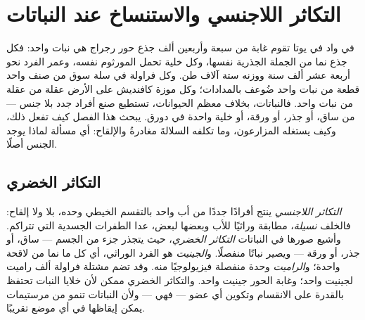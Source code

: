 \chapter{التكاثر اللاجنسي والاستنساخ عند النباتات}\label{ch:b2:asexual-reproduction}

في واد في يوتا تقوم غابة من سبعة وأربعين ألف جذع حور رجراج هي نبات
واحد: فكل جذع نما من الجملة الجذرية نفسها، وكل خلية تحمل المورثوم
نفسه، وعمر الفرد نحو أربعة عشر ألف سنة ووزنه ستة آلاف طن. وكل
فراولة في سلة سوق من صنف واحد قطعة من نبات واحد ضُوعف بالمدادات؛
وكل موزة كافنديش على الأرض عقلة من عقلة من نبات واحد. فالنباتات،
بخلاف معظم الحيوانات، تستطيع صنع أفراد جدد بلا جنس --- من ساق، أو
جذر، أو ورقة، أو خلية واحدة في دورق. يبحث هذا الفصل كيف تفعل ذلك،
وكيف يستغله المزارعون، وما تكلفه السلالةَ مغادرةُ 
والإلقاح: أي مسألة لماذا يوجد الجنس أصلًا.

\section{التكاثر الخضري}

\begin{definition}\label{def:b2:asexual-reproduction:clone}
\emph{التكاثر اللاجنسي} ينتج أفرادًا جددًا من أب واحد بالتقسم
الخيطي وحده، بلا  ولا إلقاح: فالخلف \emph{نسيلة}، مطابقة
وراثيًا للأب وبعضها لبعض، عدا الطفرات الجسدية التي تتراكم. وأشيع
صورها في النباتات \emph{التكاثر الخضري}، حيث يتجذر جزء من
الجسم --- ساق، أو جذر، أو ورقة --- ويصير نباتًا منفصلًا.
و\emph{الجينيت} هو الفرد الوراثي، أي كل ما نما من لاقحة واحدة؛
و\emph{الراميت} وحدة منفصلة فيزيولوجيًا منه. وقد تضم مشتلة فراولة
ألف راميت لجينيت واحد؛ وغابة الحور جينيت واحد. والتكاثر الخضري ممكن
لأن خلايا النبات تحتفظ بالقدرة على الانقسام وتكوين أي عضو ---
فهي \emph{} --- ولأن النباتات تنمو من مرستيمات يمكن
إيقاظها في أي موضع تقريبًا.
\end{definition}

